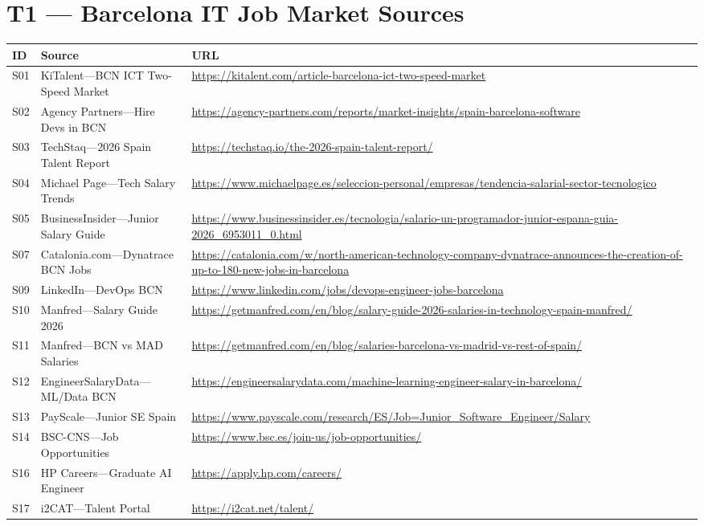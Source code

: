 \documentclass[a4paper,11pt,openany]{report}
\begin{document}
\section{T1 --- Barcelona IT Job Market Sources}

{\small
\begin{longtable}{l p{5cm} p{6.5cm}}
\toprule
\textbf{ID} & \textbf{Source} & \textbf{URL} \\
\midrule
\endhead
S01 & KiTalent---BCN ICT Two-Speed Market & \url{https://kitalent.com/article-barcelona-ict-two-speed-market} \\
S02 & Agency Partners---Hire Devs in BCN & \url{https://agency-partners.com/reports/market-insights/spain-barcelona-software} \\
S03 & TechStaq---2026 Spain Talent Report & \url{https://techstaq.io/the-2026-spain-talent-report/} \\
S04 & Michael Page---Tech Salary Trends & \url{https://www.michaelpage.es/seleccion-personal/empresas/tendencia-salarial-sector-tecnologico} \\
S05 & BusinessInsider---Junior Salary Guide & \url{https://www.businessinsider.es/tecnologia/salario-un-programador-junior-espana-guia-2026_6953011_0.html} \\
S07 & Catalonia.com---Dynatrace BCN Jobs & \url{https://catalonia.com/w/north-american-technology-company-dynatrace-announces-the-creation-of-up-to-180-new-jobs-in-barcelona} \\
S09 & LinkedIn---DevOps BCN & \url{https://www.linkedin.com/jobs/devops-engineer-jobs-barcelona} \\
S10 & Manfred---Salary Guide 2026 & \url{https://getmanfred.com/en/blog/salary-guide-2026-salaries-in-technology-spain-manfred/} \\
S11 & Manfred---BCN vs MAD Salaries & \url{https://getmanfred.com/en/blog/salaries-barcelona-vs-madrid-vs-rest-of-spain/} \\
S12 & EngineerSalaryData---ML/Data BCN & \url{https://engineersalarydata.com/machine-learning-engineer-salary-in-barcelona/} \\
S13 & PayScale---Junior SE Spain & \url{https://www.payscale.com/research/ES/Job=Junior_Software_Engineer/Salary} \\
S14 & BSC-CNS---Job Opportunities & \url{https://www.bsc.es/join-us/job-opportunities/} \\
S16 & HP Careers---Graduate AI Engineer & \url{https://apply.hp.com/careers/} \\
S17 & i2CAT---Talent Portal & \url{https://i2cat.net/talent/} \\

\end{longtable}}
\end{document}
